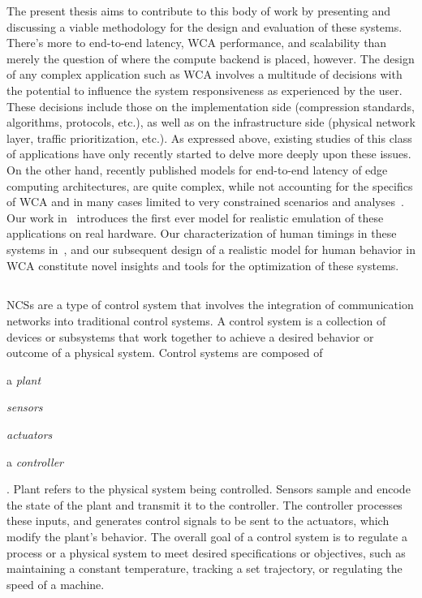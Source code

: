 The present thesis aims to contribute to this body of work by presenting and discussing a viable methodology for the design and evaluation of these systems.
There's more to end-to-end latency, \gls{WCA} performance, and scalability than merely the question of where the compute backend is placed, however.
The design of any complex application such as \gls{WCA} involves a multitude of decisions with the potential to influence the system responsiveness as experienced by the user.
These decisions include those on the implementation side (compression standards, algorithms, protocols, etc.), as well as on the infrastructure side (physical network layer, traffic prioritization, etc.).
As expressed above, existing studies of this class of applications have only recently started to delve more deeply upon these issues.
On the other hand, recently published models for end-to-end latency of edge computing architectures, are quite complex, while not accounting for the specifics of \gls{WCA} and in many cases limited to very constrained scenarios and analyses~\cite{al_zubaidy2015performance,schiessl2017finite}.
Our work in~\cite{olguinmunoz2018demoscaling,olguinmunoz2019edgedroid} introduces the first ever model for realistic emulation of these applications on real hardware.
Our characterization of human timings in these systems in~\cite{olguinmunoz2021impact}, and our subsequent design of a realistic model for human behavior in \gls{WCA} constitute novel insights and tools for the optimization of these systems.

\subsection{}\label{background:ncs}

\glspl{NCS} are a type of control system that involves the integration of communication networks into traditional control systems.
A control system is a collection of devices or subsystems that work together to achieve a desired behavior or outcome of a physical system.
Control systems are composed of
\begin{inlineenum}
    \item a \emph{plant}
    \item \emph{sensors}
    \item \emph{actuators}
    \item a \emph{controller}
\end{inlineenum}.
Plant refers to the physical system being controlled.
Sensors sample and encode the state of the plant and transmit it to the controller.
The controller processes these inputs, and generates control signals to be sent to the actuators, which modify the plant's behavior.
The overall goal of a control system is to regulate a process or a physical system to meet desired specifications or objectives, such as maintaining a constant temperature, tracking a set trajectory, or regulating the speed of a machine.


